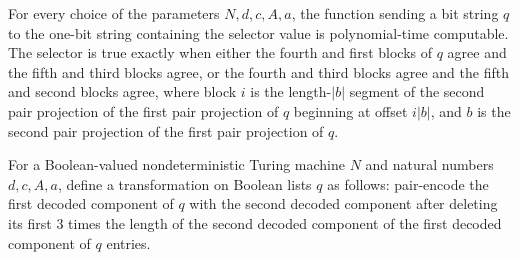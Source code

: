 \begin{theorem}
\label{Complexity.TQBFHard.pt_selT}
\leanok
{}
For every choice of the parameters $N,d,c,A,a$, the function sending a bit string $q$ to
the one-bit string containing the selector value is polynomial-time computable. The
selector is true exactly when either the fourth and first blocks of $q$ agree and the
fifth and third blocks agree, or the fourth and third blocks agree and the fifth and
second blocks agree, where block $i$ is the length-$|b|$ segment of the second pair
projection of the first pair projection of $q$ beginning at offset $i|b|$, and $b$ is
the second pair projection of the first pair projection of $q$.
\end{theorem}

\begin{definition}
\label{Complexity.TQBFHard.nxtW}
\leanok
{}
For a Boolean-valued nondeterministic Turing machine $N$ and natural numbers $d,c,A,a$,
define a transformation on Boolean lists $q$ as follows: pair-encode the first decoded
component of $q$ with the second decoded component after deleting its first $3$ times
the length of the second decoded component of the first decoded component of $q$
entries.
\end{definition}

